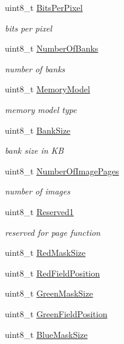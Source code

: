 \begin{DoxyCompactItemize}
uint8\+\_\+t \hyperlink{group__vbe_ga03756ae144fce823087a2a4255bf4bb1}{Bits\+Per\+Pixel}
\begin{DoxyCompactList}\small\item\em bits per pixel \end{DoxyCompactList}\item 
uint8\+\_\+t \hyperlink{group__vbe_gaa955c03441b6d3e55b2ba4be4dae56a2}{Number\+Of\+Banks}
\begin{DoxyCompactList}\small\item\em number of banks \end{DoxyCompactList}\item 
uint8\+\_\+t \hyperlink{group__vbe_gab9be703b2b515ba3428ed97af9bb084d}{Memory\+Model}
\begin{DoxyCompactList}\small\item\em memory model type \end{DoxyCompactList}\item 
uint8\+\_\+t \hyperlink{group__vbe_ga7e31ea09e6e6755e3a504b9c76b3f545}{Bank\+Size}
\begin{DoxyCompactList}\small\item\em bank size in KB \end{DoxyCompactList}\item 
uint8\+\_\+t \hyperlink{group__vbe_ga7033bb4cac6dc49f68ca4df855151e09}{Number\+Of\+Image\+Pages}
\begin{DoxyCompactList}\small\item\em number of images \end{DoxyCompactList}\item 
uint8\+\_\+t \hyperlink{group__vbe_ga604037992fe7e5fd08e1bcc684a1b12d}{Reserved1}
\begin{DoxyCompactList}\small\item\em reserved for page function \end{DoxyCompactList}\item 
uint8\+\_\+t \hyperlink{group__vbe_ga5e25f6a8eedde631fff577bcf7d4f6f4}{Red\+Mask\+Size}
\item 
uint8\+\_\+t \hyperlink{group__vbe_ga20cb142b8c1b0a2b41244fef469a11f4}{Red\+Field\+Position}
\item 
uint8\+\_\+t \hyperlink{group__vbe_gac7b4df72e505b74493e7d5144cbac743}{Green\+Mask\+Size}
\item 
uint8\+\_\+t \hyperlink{group__vbe_ga602b28f8e5da781eabfd736743a6ea09}{Green\+Field\+Position}
\item 
uint8\+\_\+t \hyperlink{group__vbe_ga84842a6a42e881ce7be87482122bcc4e}{Blue\+Mask\+Size}

\end{DoxyCompactItemize}
